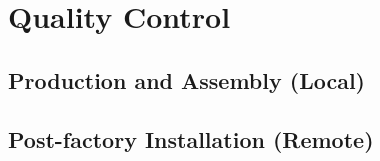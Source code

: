 \section{Quality Control}
\label{sec:fdsp-pd-qc}


\subsection{Production and Assembly (Local)}
\label{sec:fdsp-pd-qc-local}


\subsection{Post-factory Installation (Remote)}
\label{sec:fdsp-pd-qc-remote}


